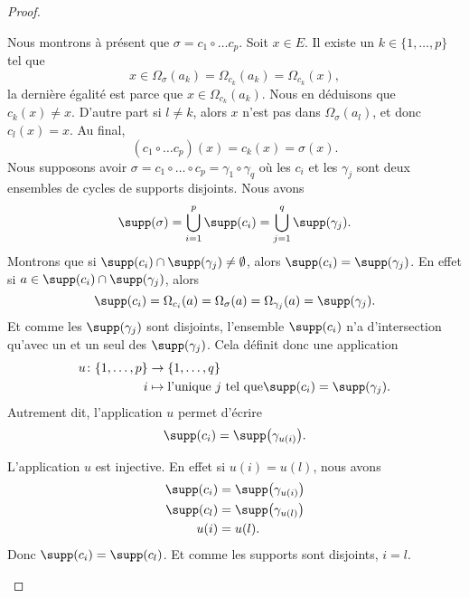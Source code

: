 \begin{proof}
\begin{subproof}
		Nous montrons à présent que \( \sigma=c_1\circ\ldots c_p\). Soit \( x\in E\). Il existe un \( k\in\{1,\ldots, p \}\) tel que
		\begin{equation}
			x\in \Omega_{\sigma}(a_k)=\Omega_{c_k}(a_k)=\Omega_{c_k}(x),
		\end{equation}
		la dernière égalité est parce que \( x\in \Omega_{c_k}(a_k)\). Nous en déduisons que \( c_k(x)\neq x\). D'autre part si \( l\neq k\), alors \( x\) n'est pas dans \( \Omega_{\sigma}(a_l)\), et donc \( c_l(x)=x\). Au final,
		\begin{equation}
			(c_1\circ\ldots c_p)(x)=c_k(x)=\sigma(x).
		\end{equation}
		\spitem[Unicité]
		Nous supposons avoir \( \sigma=c_1\circ\ldots\circ c_p=\gamma_1\circ\gamma_q\) où les \(  c_i\) et les \( \gamma_j\) sont deux ensembles de cycles de supports disjoints. Nous avons
		\begin{equation}
			\supp(\sigma)=\bigcup_{i=1}^p\supp(c_i)=\bigcup_{j=1}^q\supp(\gamma_j).
		\end{equation}
		Montrons que si \( \supp(c_i)\cap\supp(\gamma_j)\neq \emptyset\), alors \( \supp(c_i)=\supp(\gamma_j)\). En effet si \( a\in\supp(c_i)\cap\supp(\gamma_j)\), alors
		\begin{equation}
			\supp(c_i)=\Omega_{c_i}(a)=\Omega_{\sigma}(a)=\Omega_{\gamma_j}(a)=\supp(\gamma_j).
		\end{equation}
		Et comme les \( \supp(\gamma_j)\) sont disjoints, l'ensemble \( \supp(c_i)\) n'a d'intersection qu'avec un et un seul des \( \supp(\gamma_j)\). Cela définit donc une application
		\begin{equation}
			\begin{aligned}
				u\colon \{ 1,\ldots, p \} & \to \{ 1,\ldots, q \}                                              \\
				i                         & \mapsto \text{l'unique \( j\) tel que} \supp(c_i)=\supp(\gamma_j).
			\end{aligned}
		\end{equation}
		Autrement dit, l'application \( u\) permet d'écrire
		\begin{equation}
			\supp(c_i)=\supp\big( \gamma_{u(i)} \big).
		\end{equation}

		L'application \( u\) est injective. En effet si \( u(i)=u(l)\), nous avons
		\begin{subequations}
			\begin{align}
				\supp(c_i) & =\supp\big( \gamma_{u(i)} \big) \\
				\supp(c_l) & =\supp\big( \gamma_{u(l)} \big) \\
				u(i)       & =u(l).
			\end{align}
		\end{subequations}
		Donc \( \supp(c_i)=\supp(c_l)\). Et comme les supports sont disjoints, \( i=l\).


\end{subproof}
\end{proof}
